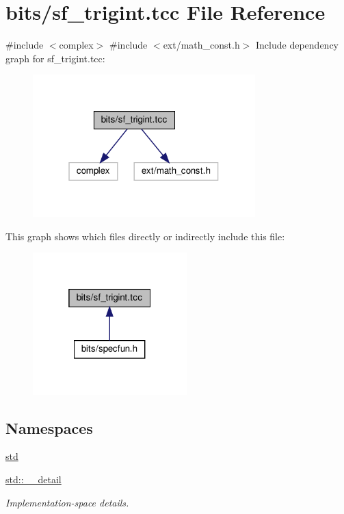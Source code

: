 \hypertarget{sf__trigint_8tcc}{}\section{bits/sf\+\_\+trigint.tcc File Reference}
\label{sf__trigint_8tcc}
{\ttfamily \#include $<$complex$>$}\newline
{\ttfamily \#include $<$ext/math\+\_\+const.\+h$>$}\newline
Include dependency graph for sf\+\_\+trigint.\+tcc\+:
\nopagebreak
\begin{figure}[H]
\begin{center}
\leavevmode
\includegraphics[width=244pt]{sf__trigint_8tcc__incl}
\end{center}
\end{figure}
This graph shows which files directly or indirectly include this file\+:
\nopagebreak
\begin{figure}[H]
\begin{center}
\leavevmode
\includegraphics[width=169pt]{sf__trigint_8tcc__dep__incl}
\end{center}
\end{figure}
\subsection*{Namespaces}
\begin{DoxyCompactItemize}
\item 
 \hyperlink{namespacestd}{std}
\item 
 \hyperlink{namespacestd_1_1____detail}{std\+::\+\_\+\+\_\+detail}
\begin{DoxyCompactList}\small\item\em Implementation-\/space details. \end{DoxyCompactList}\end{DoxyCompactItemize}
